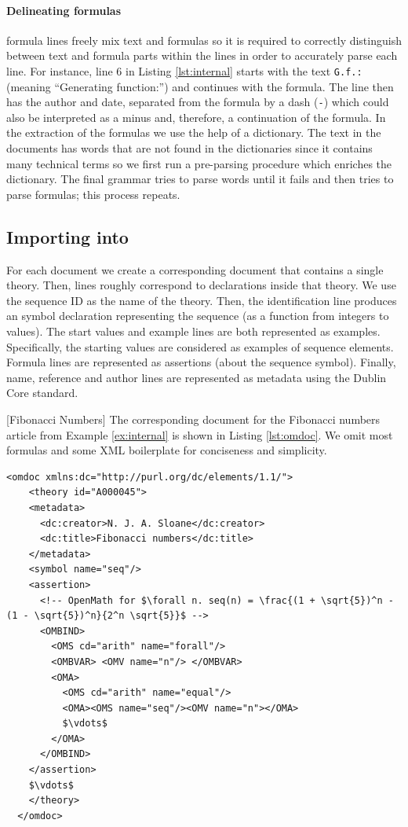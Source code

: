 \paragraph{Delineating formulas}
\oeis formula lines freely mix text and formulas so it is required to correctly distinguish between text and formula
parts within the lines in order to accurately parse each line. For instance, line $6$ in Listing
\ref{lst:internal} starts with the text \lstinline!G.f.:! (meaning ``Generating function:'') and continues with the
formula. The line then has the author and date, separated from the formula by a dash (\lstinline!-!) which
could also be interpreted as a minus and, therefore, a continuation of the formula.
In the extraction of the formulas we use the help of a dictionary. The text in the \oeis documents has words
that are not found in the dictionaries since it contains many technical terms so we first run a
pre-parsing procedure which enriches the dictionary. The final grammar tries to parse words until it fails and then
tries to parse formulas; this process repeats.

\subsection{Importing into \omdmmt}
For each \oeis document we create a corresponding \omdmmt document that contains a single theory. Then, \oeis lines
roughly correspond to \omdmmt declarations inside that theory. We use the \oeis sequence ID as the name of the \omdoc
theory. Then, the identification line produces an \omdoc symbol declaration representing the sequence (as a function
from integers to values). The start values and example lines are both represented as \omdmmt examples. Specifically,
the starting values are considered as examples of sequence elements. Formula lines are represented as \omdoc
assertions
(about the sequence symbol). Finally, name, reference and author lines are represented as metadata using the Dublin
Core standard.

[Fibonacci Numbers]\label{ex:omdoc}
 The corresponding \omdmmt document for the Fibonacci numbers article from Example \ref{ex:internal} is shown
 in Listing \ref{lst:omdoc}. We omit most formulas and some XML boilerplate for conciseness and simplicity.

 \begin{lstlisting}[mathescape,label=lst:omdoc]
  <omdoc xmlns:dc="http://purl.org/dc/elements/1.1/">
    <theory id="A000045">
    <metadata>
      <dc:creator>N. J. A. Sloane</dc:creator>
      <dc:title>Fibonacci numbers</dc:title>
    </metadata>
    <symbol name="seq"/>
    <assertion>
      <!-- OpenMath for $\forall n. seq(n) = \frac{(1 + \sqrt{5})^n - (1 - \sqrt{5})^n}{2^n \sqrt{5}}$ -->
      <OMBIND>
        <OMS cd="arith" name="forall"/>
        <OMBVAR> <OMV name="n"/> </OMBVAR>
        <OMA>
          <OMS cd="arith" name="equal"/>
          <OMA><OMS name="seq"/><OMV name="n"></OMA>
          $\vdots$
        </OMA>
      </OMBIND>
    </assertion>
    $\vdots$
    </theory>
  </omdoc>
 \end{lstlisting}



